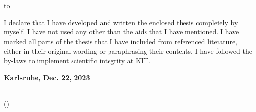 \thispagestyle{empty}
\null\vfill
\noindent\hbox to \textwidth{\hrulefill}

I declare that I have developed and written the enclosed
thesis completely by myself. 
I have not used any other than the aids that I have mentioned. 
I have marked all parts of the thesis that I have included from 
referenced literature, either in their original wording or paraphrasing their
contents. 
I have followed the by-laws to implement scientific integrity at KIT.

\textbf{Karlsruhe, Dec. 22, 2023}
\vspace{1.5cm}
 
\dotfill\hspace*{8.0cm}\\
\hspace*{2cm}(\theauthor)
\cleardoublepage
